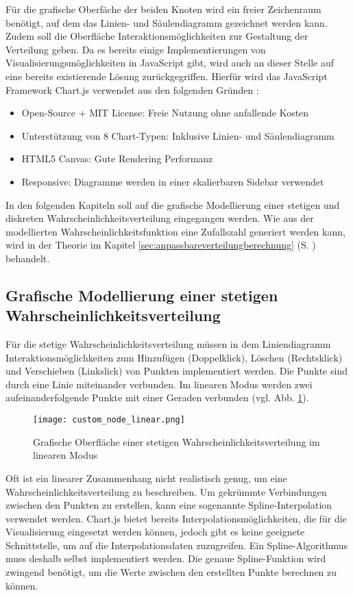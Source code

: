 Für die grafische Oberfäche der beiden Knoten wird ein freier Zeichenraum benötigt, auf dem das Linien- und Säulendiagramm gezeichnet werden kann. Zudem soll die Oberfläche Interaktionsmöglichkeiten zur Gestaltung der Verteilung geben. Da es bereits einige Implementierungen von Visualisierungsmöglichkeiten in JavaScript gibt, wird auch an dieser Stelle auf eine bereits existierende Lösung zurückgegriffen. Hierfür wird das JavaScript Framework Chart.js verwendet aus den folgenden Gründen \cite{chartjs}:
\begin{itemize}
    \item Open-Source + MIT License: Freie Nutzung ohne anfallende Kosten
    \item Unterstützung von 8 Chart-Typen: Inklusive Linien- und Säulendiagramm
    \item HTML5 Canvas: Gute Rendering Performanz
    \item Responsive: Diagramme werden in einer skalierbaren Sidebar verwendet
\end{itemize}

In den folgenden Kapiteln soll auf die grafische Modellierung einer stetigen und diskreten Wahrscheinlichkeitsverteilung eingegangen werden. Wie aus der modellierten Wahrscheinlichkeitsfunktion eine Zufallszahl generiert werden kann, wird in der Theorie im Kapitel \ref{sec:anpassbareverteilungberechnung} (S. \pageref{sec:anpassbareverteilungberechnung}) behandelt.

\subsection{Grafische Modellierung einer stetigen Wahrscheinlichkeitsverteilung}

Für die stetige Wahrscheinlichkeitsverteilung müssen in dem Liniendiagramm Interaktionsmöglichkeiten zum Hinzufügen (Doppelklick), Löschen (Rechtsklick) und Verschieben (Linkslick) von Punkten implementiert werden. Die Punkte sind durch eine Linie miteinander verbunden. Im linearen Modus werden zwei aufeinanderfolgende Punkte mit einer Geraden verbunden (vgl. Abb. \ref{fig:customnodelinear}).

\begin{figure}[H]
    \centering
    \texttt{[image: custom\_node\_linear.png]}
    \caption{Grafische Oberfläche einer stetigen Wahrscheinlichkeitsverteilung im linearen Modus}\label{fig:customnodelinear}
\end{figure}

Oft ist ein linearer Zusammenhang nicht realistisch genug, um eine Wahrscheinlichkeitsverteilung zu beschreiben. Um gekrümmte Verbindungen zwischen den Punkten zu erstellen, kann eine sogenannte Spline-Interpolation verwendet werden. Chart.js bietet bereits Interpolationsmöglichkeiten, die für die Visualisierung eingesetzt werden können, jedoch gibt es keine geeignete Schnittstelle, um auf die Interpolationsdaten zuzugreifen. Ein Spline-Algorithmus muss deshalb selbst implementiert werden. Die genaue Spline-Funktion wird zwingend benötigt, um die Werte zwischen den erstellten Punkte berechnen zu können.


